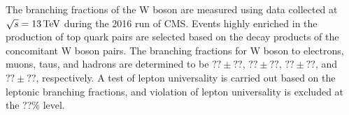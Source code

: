 \abstract

The branching fractions of the W boson are measured using data collected at $\sqrt{s}=13\,\text{Te\hspace{-.08em}V}$ during the 2016 run of CMS.  Events highly enriched in the production of top quark pairs are selected based on the decay products of the concomitant W boson pairs. The branching fractions for W boson to electrons, muons, taus, and hadrons are determined to be $?? \pm ??$, $?? \pm ??$, $?? \pm ??$, and $?? \pm ??$, respectively.  A test of lepton universality is carried out based on the leptonic branching fractions, and violation of lepton universality is excluded at the ??\% level.